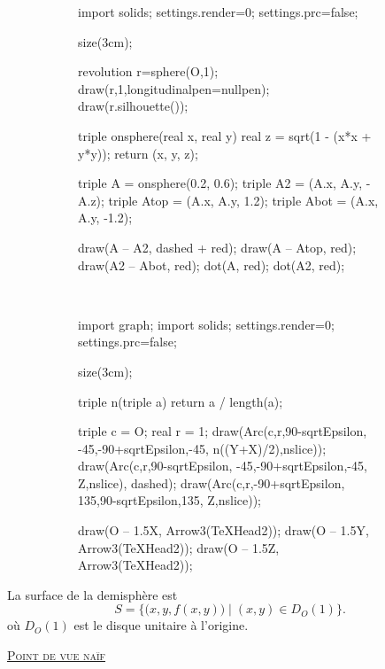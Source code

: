 \begin{figure}[H]
	\centering
	\begin{subfigure}{3cm}
		\centering
		\begin{asy}
			import solids;
			settings.render=0;
			settings.prc=false;

			size(3cm);

			revolution r=sphere(O,1);
			draw(r,1,longitudinalpen=nullpen);
			draw(r.silhouette());

			triple onsphere(real x, real y) {
				real z = sqrt(1 - (x*x + y*y));
				return (x, y, z);
			}

			triple A = onsphere(0.2, 0.6);
			triple A2 = (A.x, A.y, -A.z);
			triple Atop = (A.x, A.y, 1.2);
			triple Abot = (A.x, A.y, -1.2);

			draw(A -- A2, dashed + red);
			draw(A -- Atop, red);
			draw(A2 -- Abot, red);
			dot(A, red);
			dot(A2, red);
		\end{asy}
	\end{subfigure}
	\begin{subfigure}
		{1cm}~\\ %
	\end{subfigure}
	\begin{subfigure}{3cm}
		\centering
		\begin{asy}
			import graph;
			import solids;
			settings.render=0;
			settings.prc=false;

			size(3cm);

			triple n(triple a) { return a / length(a); }

			triple c = O;
			real r = 1;
			draw(Arc(c,r,90-sqrtEpsilon, -45,-90+sqrtEpsilon,-45, n((Y+X)/2),nslice));
			draw(Arc(c,r,90-sqrtEpsilon, -45,-90+sqrtEpsilon,-45, Z,nslice), dashed);
			draw(Arc(c,r,-90+sqrtEpsilon, 135,90-sqrtEpsilon,135, Z,nslice));


			draw(O -- 1.5X, Arrow3(TeXHead2));
			draw(O -- 1.5Y, Arrow3(TeXHead2));
			draw(O -- 1.5Z, Arrow3(TeXHead2));
		\end{asy}
	\end{subfigure}
\end{figure}

La surface de la demisphère est \[
	S = \big\{\big(x,y,f(x,y)\big)  \mid (x,y) \in D_O(1) \big\}.
\] où $D_O(1)$ est le disque unitaire à l'origine.

\vspace{2mm}
\begin{center}
	\underline{\Large \scshape Point de vue naïf}
\end{center}
\vspace{2mm}

